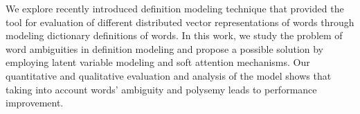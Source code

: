 We explore recently introduced definition modeling technique that provided the tool for evaluation of different distributed vector representations of words through modeling dictionary definitions of words. In this work,  we study the problem of word ambiguities in definition modeling and propose a possible solution by employing latent variable modeling and soft attention mechanisms. Our quantitative and qualitative evaluation and analysis of the model shows that taking into account words' ambiguity and polysemy leads to performance improvement.

